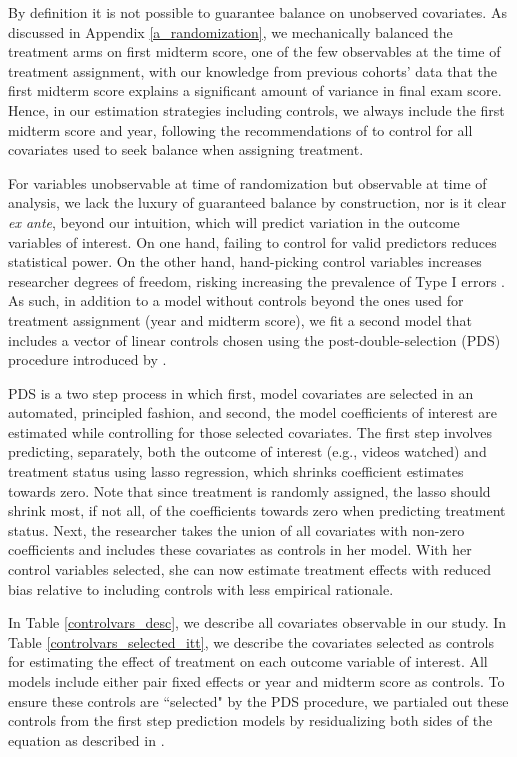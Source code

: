 \documentclass[12pt]{article}
\begin{document}
By definition it is not possible to guarantee balance on unobserved covariates. As discussed in Appendix \ref{a_randomization}, we mechanically balanced the treatment arms on first midterm score, one of the few observables at the time of treatment assignment, with our knowledge from previous cohorts' data that the first midterm score explains a significant amount of variance in final exam score. Hence, in our estimation strategies including controls, we always include the first midterm score and year, following the recommendations of \textcite{bm2009} to control for all covariates used to seek balance when assigning treatment.

For variables unobservable at time of randomization but observable at time of analysis, we lack the luxury of guaranteed balance by construction, nor is it clear \textit{ex ante}, beyond our intuition, which will predict variation in the outcome variables of interest. On one hand, failing to control for valid predictors reduces statistical power. On the other hand, hand-picking control variables increases researcher degrees of freedom, risking increasing the prevalence of Type I errors \parencite{sns2011}. As such, in addition to a model without controls beyond the ones used for treatment assignment (year and midterm score), we fit a second model that includes a vector of linear controls chosen using the post-double-selection (PDS) procedure introduced by \textcite{bch2014a}.

PDS is a two step process in which first, model covariates are selected in an automated, principled fashion, and second, the model coefficients of interest are estimated while controlling for those selected covariates. The first step involves predicting, separately, both the outcome of interest (e.g., videos watched) and treatment status using lasso regression, which shrinks coefficient estimates towards zero. Note that since treatment is randomly assigned, the lasso should shrink most, if not all, of the coefficients towards zero when predicting treatment status. Next, the researcher takes the union of all covariates with non-zero coefficients and includes these covariates as controls in her model. With her control variables selected, she can now estimate treatment effects with reduced bias relative to including controls with less empirical rationale.

In Table \ref{controlvars_desc}, we describe all covariates observable in our study. In Table \ref{controlvars_selected_itt}, we describe the covariates selected as controls for estimating the effect of treatment on each outcome variable of interest. All models include either pair fixed effects or year and midterm score as controls. To ensure these controls are ``selected" by the PDS procedure, we partialed out these controls from the first step prediction models by residualizing both sides of the equation as described in \textcite{bch2014b}.
\end{document}
